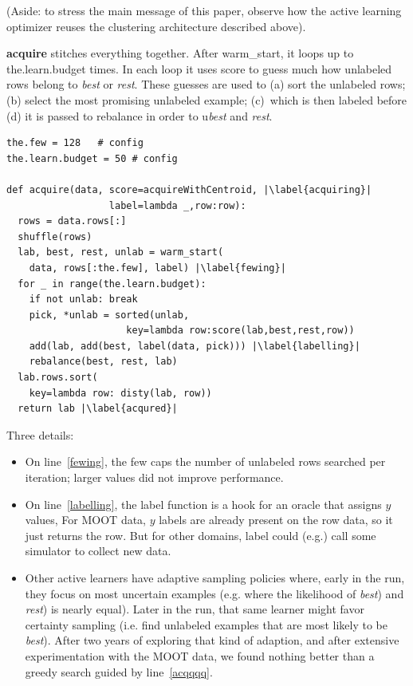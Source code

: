 \documentclass[AMA,STIX2COL]{WileyNJDv5}
\begin{document}
(Aside: to stress the main 
message of this paper, observe how the active learning optimizer reuses the 
clustering architecture described above).


\textbf{acquire} stitches everything together. After \textsf{warm\_start}, 
it loops up to \textsf{the.learn.budget} times.
In each loop it uses \textsf{score} to guess  much how unlabeled rows
belong to {\em best} or {\em rest}. These guesses
are used to (a) sort the   unlabeled rows; (b) select the most promising
unlabeled example; (c)~which is then labeled
before (d) it is passed to   \textsf{rebalance}  in order to
u\textit{best} and 
\textit{rest}.
\begin{verbatim}
the.few = 128   # config
the.learn.budget = 50 # config

def acquire(data, score=acquireWithCentroid, |\label{acquiring}|
                  label=lambda _,row:row): 
  rows = data.rows[:]
  shuffle(rows)
  lab, best, rest, unlab = warm_start(
    data, rows[:the.few], label) |\label{fewing}|
  for _ in range(the.learn.budget):
    if not unlab: break
    pick, *unlab = sorted(unlab,
                     key=lambda row:score(lab,best,rest,row))
    add(lab, add(best, label(data, pick))) |\label{labelling}|
    rebalance(best, rest, lab)
  lab.rows.sort(
    key=lambda row: disty(lab, row))
  return lab |\label{acqured}|
\end{verbatim}
Three details:
\begin{itemize}
\item
On  line~\ref{fewing}, 
the \textsf{few} caps the number of unlabeled rows searched
 per iteration; larger values did not improve performance.
\item
On line~\ref{labelling},
the 
\textsf{label} function is 
a hook for an oracle  that assigns $y$ values,
For MOOT data, $y$ labels are already present on the row data, so it just returns
the   row. But for other domains, \textsf{label} could (e.g.) call some
simulator to collect new data.
\item
Other active learners have adaptive sampling policies where, early in the run,
they focus on   most uncertain
examples (e.g. where the likelihood of {\em best}) and {\em rest}) is nearly equal). Later in the run, that same learner  might favor  certainty sampling (i.e. find unlabeled examples that are most
likely to be {\em best}). After two years of exploring that kind of adaption, and after extensive
experimentation with the MOOT data, we found   nothing   better than
a
greedy search guided by line~\ref{acqqqq}.
\end{itemize}
\end{document}
